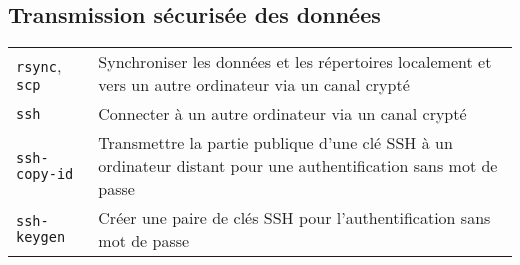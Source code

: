 \documentclass[10pt,a4paper]{article}
\begin{document}
\begin{multicols}{2}
\section{Transmission sécurisée des données}
\begin{tabular}{ p{2.5cm} p{8.5cm} }
  \hline
  \texttt{rsync}, \texttt{scp} & Synchroniser les données et les répertoires localement et vers un autre ordinateur via un canal crypté \\
  \texttt{ssh} & Connecter à un autre ordinateur via un canal crypté\\
  \texttt{ssh-copy-id} & Transmettre la partie publique d'une clé SSH à un ordinateur distant pour une authentification sans mot de passe\\
  \texttt{ssh-keygen} & Créer une paire de clés SSH pour l'authentification sans mot de passe\\
  \hline
\end{tabular}


\columnbreak


\end{multicols}
\end{document}
